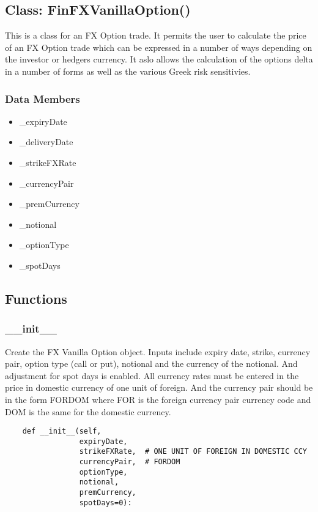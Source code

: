 \documentclass[twoside,11pt]{book}
\begin{document}
\subsection*{Class: FinFXVanillaOption()}
This is a class for an FX Option trade. It permits the user to calculate the price of an FX Option trade which can be expressed in a number of ways depending on the investor or hedgers currency. It aslo allows the calculation of the options delta in a number of forms as well as the various Greek risk sensitivies.  

\subsubsection*{Data Members}
\begin{itemize}
\item{\_expiryDate}
\item{\_deliveryDate}
\item{\_strikeFXRate}
\item{\_currencyPair}
\item{\_premCurrency}
\item{\_notional}
\item{\_optionType}
\item{\_spotDays}
\end{itemize}

\subsection*{Functions}

\subsubsection*{{\bf \_\_init\_\_}}
Create the FX Vanilla Option object. Inputs include expiry date, strike, currency pair, option type (call or put), notional and the currency of the notional. And adjustment for spot days is enabled. All currency rates must be entered in the price in domestic currency of one unit of foreign. And the currency pair should be in the form FORDOM where FOR is the foreign currency pair currency code and DOM is the same for the domestic currency.  

\begin{lstlisting}
    def __init__(self,
                 expiryDate,
                 strikeFXRate,  # ONE UNIT OF FOREIGN IN DOMESTIC CCY
                 currencyPair,  # FORDOM
                 optionType,
                 notional,
                 premCurrency,
                 spotDays=0):
\end{lstlisting}
\end{document}
